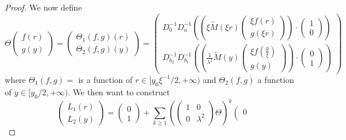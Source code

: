 \documentclass[11 pt]{amsart}
\theoremstyle{definition}
\theoremstyle{remark}
\numberwithin{equation}{section}
\begin{document}
\begin{proof}
  We now define
  \[ \Theta \left(\begin{array}{c}
       f (r)\\
       g (y)
     \end{array}\right) = \left(\begin{array}{c}
       \Theta_1 (f, g) (r)\\
       \Theta_2 (f, g) (y)
     \end{array}\right) = \left(\begin{array}{c}
       D_0^{- 1} D_a^{- 1} \left( \left( \xi \widetilde{M} (\xi r)
       \left(\begin{array}{c}
         \xi f (r)\\
         g (\xi r)
       \end{array}\right) \right) \cdot \left(\begin{array}{c}
         1\\
         0
       \end{array}\right) \right)\\
      D_{b_2}^{- 1} D_{b_1}^{- 1} \left( \left( \frac{1}{\lambda^2}\widetilde{M} (y)
       \left(\begin{array}{c}
         \xi f \left( \frac{y}{\xi} \right)\\
         g (y)
       \end{array}\right) \right) \cdot \left(\begin{array}{c}
         0\\
         1
       \end{array}\right) \right)
     \end{array}\right) \]
  where $\Theta_1 (f, g) =$ is a function of $r \in [y_0\xi^{- 1}/2, + \infty )$ and $\Theta_2 (f, g)$ a function of $y \in [y_0/2, + \infty )$. We then want to
  construct
  \begin{equation}\label{fixed-point-equation-L1-L2} \left(\begin{array}{c}
       L_1 (r)\\
       L_2 (y)
     \end{array}\right) =\left(\begin{array}{c} 0\\ 1\end{array}\right)+  \sum_{k \geq 1} \left(\begin{pmatrix} 1 & 0 \\ 0 & \lambda^2 \end{pmatrix} \Theta \right)^k
     \left(\begin{array}{c}
       0\\

\end{array}
\end{equation}
\end{proof}
\end{document}
